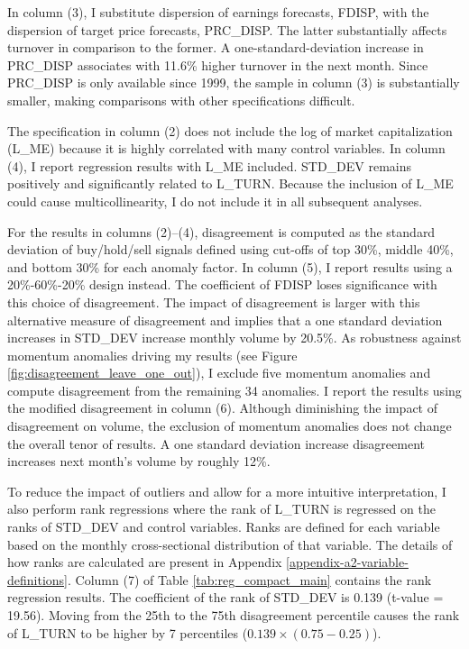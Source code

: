 \documentclass[
  12pt,
  a4paper,
  twoside,
  onecolumn]{article}
\begin{document}
In column (3), I substitute dispersion of earnings forecasts, FDISP,
with the dispersion of target price forecasts, PRC\_DISP. The latter
substantially affects turnover in comparison to the former. A
one-standard-deviation increase in PRC\_DISP associates with 11.6\%
higher turnover in the next month. Since PRC\_DISP is only available
since 1999, the sample in column (3) is substantially smaller, making
comparisons with other specifications difficult.

The specification in column (2) does not include the log of market
capitalization (L\_ME) because it is highly correlated with many control
variables. In column (4), I report regression results with L\_ME
included. STD\_DEV remains positively and significantly related to
L\_TURN. Because the inclusion of L\_ME could cause multicollinearity, I
do not include it in all subsequent analyses.

For the results in columns (2)--(4), disagreement is computed as the
standard deviation of buy/hold/sell signals defined using cut-offs of
top 30\%, middle 40\%, and bottom 30\% for each anomaly factor. In
column (5), I report results using a 20\%-60\%-20\% design instead. The
coefficient of FDISP loses significance with this choice of
disagreement. The impact of disagreement is larger with this alternative
measure of disagreement and implies that a one standard deviation
increases in STD\_DEV increase monthly volume by 20.5\%. As robustness
against momentum anomalies driving my results (see Figure
\ref{fig:disagreement_leave_one_out}), I exclude five momentum anomalies
and compute disagreement from the remaining 34 anomalies. I report the
results using the modified disagreement in column (6). Although
diminishing the impact of disagreement on volume, the exclusion of
momentum anomalies does not change the overall tenor of results. A one
standard deviation increase disagreement increases next month's volume
by roughly 12\%.

To reduce the impact of outliers and allow for a more intuitive
interpretation, I also perform rank regressions where the rank of
L\_TURN is regressed on the ranks of STD\_DEV and control variables.
Ranks are defined for each variable based on the monthly cross-sectional
distribution of that variable. The details of how ranks are calculated
are present in Appendix \ref{appendix-a2-variable-definitions}. Column
(7) of Table \ref{tab:reg_compact_main} contains the rank regression
results. The coefficient of the rank of STD\_DEV is 0.139 (t-value =
19.56). Moving from the 25th to the 75th disagreement percentile causes
the rank of L\_TURN to be higher by 7 percentiles
(\(0.139 \times (0.75 - 0.25)\)).
\end{document}
